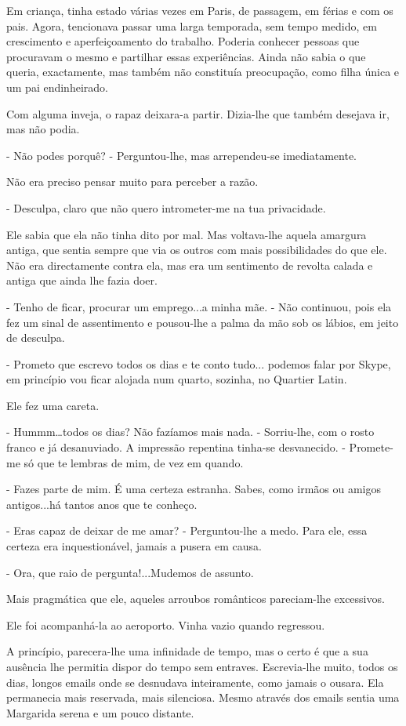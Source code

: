 Em criança, tinha estado várias vezes em Paris, de passagem, em férias e
com os pais. Agora, tencionava passar uma larga temporada, sem tempo
medido, em crescimento e aperfeiçoamento do trabalho. Poderia conhecer
pessoas que procuravam o mesmo e partilhar essas experiências. Ainda não
sabia o que queria, exactamente, mas também não constituía preocupação,
como filha única e um pai endinheirado.

Com alguma inveja, o rapaz deixara-a partir. Dizia-lhe que também
desejava ir, mas não podia.

- Não podes porquê? - Perguntou-lhe, mas arrependeu-se imediatamente.

Não era preciso pensar muito para perceber a razão.

- Desculpa, claro que não quero intrometer-me na tua privacidade.

Ele sabia que ela não tinha dito por mal. Mas voltava-lhe aquela
amargura antiga, que sentia sempre que via os outros com mais
possibilidades do que ele. Não era directamente contra ela, mas era um
sentimento de revolta calada e antiga que ainda lhe fazia doer.

- Tenho de ficar, procurar um emprego...a minha mãe. - Não continuou,
pois ela fez um sinal de assentimento e pousou-lhe a palma da mão sob os
lábios, em jeito de desculpa.

- Prometo que escrevo todos os dias e te conto tudo... podemos falar por
Skype, em princípio vou ficar alojada num quarto, sozinha, no Quartier
Latin.

Ele fez uma careta.

- Hummm\ldots{}todos os dias? Não fazíamos mais nada. - Sorriu-lhe, com
o rosto franco e já desanuviado. A impressão repentina tinha-se
desvanecido. - Promete-me só que te lembras de mim, de vez em quando.

- Fazes parte de mim. É uma certeza estranha. Sabes, como irmãos ou
amigos antigos...há tantos anos que te conheço.

- Eras capaz de deixar de me amar? - Perguntou-lhe a medo. Para ele,
essa certeza era inquestionável, jamais a pusera em causa.

- Ora, que raio de pergunta!...Mudemos de assunto.

Mais pragmática que ele, aqueles arroubos românticos pareciam-lhe
excessivos.

Ele foi acompanhá-la ao aeroporto. Vinha vazio quando regressou.

A princípio, parecera-lhe uma infinidade de tempo, mas o certo é que a
sua ausência lhe permitia dispor do tempo sem entraves. Escrevia-lhe
muito, todos os dias, longos emails onde se desnudava inteiramente, como
jamais o ousara. Ela permanecia mais reservada, mais silenciosa. Mesmo
através dos emails sentia uma Margarida serena e um pouco distante.

